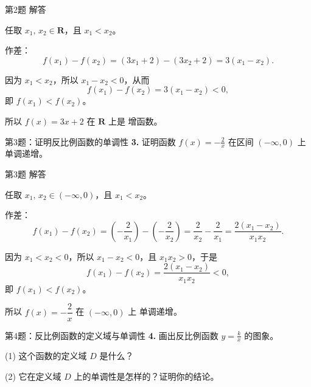 \documentclass[10pt,aspectratio=169,serif]{beamer}
\begin{document}
\begin{frame}[t]{第2题 解答}
\begin{tcolorbox}[colback=orange!10,colframe=orange,title=\textbf{证明}]
任取 $x_1,\,x_2\in\mathbf{R}$，且 $x_1<x_2$。

\vspace{0.3em}
作差：
\[
f(x_1)-f(x_2)=(3x_1+2)-(3x_2+2)=3(x_1-x_2).
\]

\vspace{0.3em}
因为 $x_1<x_2$，所以 $x_1-x_2<0$，从而
\[
f(x_1)-f(x_2)=3(x_1-x_2)<0,
\]
即 $f(x_1)<f(x_2)$。

\vspace{0.3em}
所以 $f(x)=3x+2$ 在 $\mathbf{R}$ 上是 \alert{增函数}。
\end{tcolorbox}
\end{frame}

\begin{frame}[t]{第3题：证明反比例函数的单调性}
\textbf{3.} 证明函数 $\displaystyle f(x)=-\frac{2}{x}$ 在区间 $(-\infty,0)$ 上单调递增。
\end{frame}

\begin{frame}[t]{第3题 解答}\vspace{-1em}
\begin{tcolorbox}[colback=orange!10,colframe=orange,title=\textbf{证明}]
任取 $x_1,\,x_2\in(-\infty,0)$，且 $x_1<x_2$。

\vspace{0.3em}
作差：
\[
f(x_1)-f(x_2)=\left(-\frac{2}{x_1}\right)-\left(-\frac{2}{x_2}\right)
=\frac{2}{x_2}-\frac{2}{x_1}
=\frac{2(x_1-x_2)}{x_1x_2}.
\]

\vspace{0.3em}
因为 $x_1<x_2<0$，所以 $x_1-x_2<0$，且 $x_1x_2>0$，于是
\[
f(x_1)-f(x_2)=\frac{2(x_1-x_2)}{x_1x_2}<0,
\]
即 $f(x_1)<f(x_2)$。

\vspace{0.3em}
所以 $f(x)=-\dfrac{2}{x}$ 在 $(-\infty,0)$ 上 \alert{单调递增}。
\end{tcolorbox}
\end{frame}

\begin{frame}[t]{第4题：反比例函数的定义域与单调性}
\textbf{4.} 画出反比例函数 $\displaystyle y=\frac{k}{x}$ 的图象。

\vspace{0.8em}
(1) 这个函数的定义域 $D$ 是什么？

\vspace{0.8em}
(2) 它在定义域 $D$ 上的单调性是怎样的？证明你的结论。
\end{frame}
\end{document}
